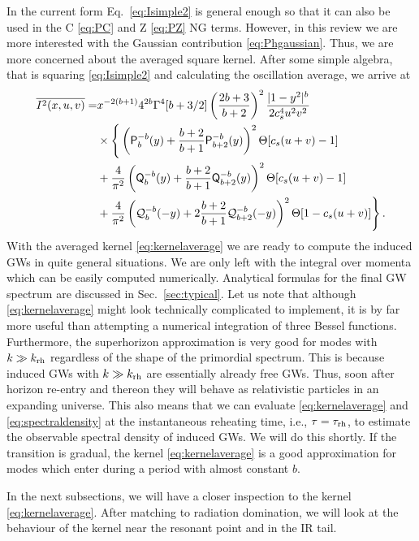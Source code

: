 \documentclass[a4paper,11pt]{article}
\numberwithin{equation}{section}
\begin{document}
In the current form Eq.~\eqref{eq:Isimple2} is general enough so that it can also be used in the C \eqref{eq:PC} and Z \eqref{eq:PZ} NG terms. However, in this review we are more interested with the Gaussian contribution \eqref{eq:Phgaussian}. Thus, we are more concerned about the averaged square kernel. After some simple algebra, that is squaring \eqref{eq:Isimple2} and calculating the oscillation average, we arrive at
\begin{align}\label{eq:kernelaverage}
\overline{I^2(x,u,v)}=&x^{-2(b+1)} 4^{2b}\Gamma^4[b+3/2]\left(\frac{2b+3}{b+2}\right)^2\frac{|1-y^2|^{b}}{2c_s^4 u^2v^2}\nonumber\\&
\times\Bigg\{\left(\mathsf{P}^{-b}_{b}(y)+\frac{b+2}{b+1}\mathsf{P}^{-b}_{b+2}(y)\right)^2\Theta[c_s(u+v)-1]\nonumber\\&
+\frac{4}{\pi^2}\left(\mathsf{Q}^{-b}_{b}(y)+\frac{b+2}{b+1}\mathsf{Q}^{-b}_{b+2}(y)\right)^2\Theta[c_s(u+v)-1]\nonumber\\&
+\frac{4}{\pi^2}\left({\cal Q}^{-b}_{b}(-y)+2\frac{b+2}{b+1}\mathsf{\cal Q}^{-b}_{b+2}(-y)\right)^2\Theta[1-c_s(u+v)]\Bigg\}\,.
\end{align}
With the averaged kernel \eqref{eq:kernelaverage} we are ready to compute the induced GWs in quite general situations. We are only left with the integral over momenta which can be easily computed numerically. Analytical formulas for the final GW spectrum are discussed in Sec.~\ref{sec:typical}. Let us note that although \eqref{eq:kernelaverage} might look technically complicated to implement, it is by far more useful than attempting a numerical integration of three Bessel functions. Furthermore, the superhorizon approximation is very good for modes with $k\gg k_{\rm rh}$ regardless of the shape of the primordial spectrum. This is because induced GWs with $k\gg k_{\rm rh}$ are essentially already free GWs. Thus, soon after horizon re-entry and thereon they will behave as relativistic particles in an expanding universe. This also means that we can evaluate \eqref{eq:kernelaverage} and \eqref{eq:spectraldensity} at the instantaneous reheating time, i.e., $\tau=\tau_{\rm rh}$, to estimate the observable spectral density of induced GWs. We will do this shortly. If the transition is gradual, the kernel \eqref{eq:kernelaverage} is a good approximation for modes which enter during a period with almost constant $b$.


In the next subsections, we will have a closer inspection to the kernel \eqref{eq:kernelaverage}. After matching to radiation domination, we will look at the behaviour of the kernel near the resonant point and in the IR tail.
\end{document}
